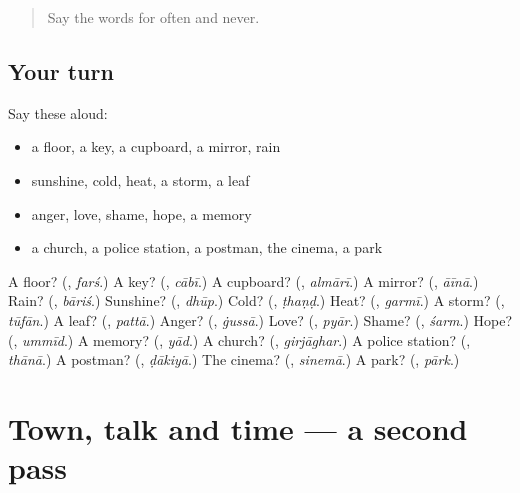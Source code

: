 \label{lesson:HI-R192-first-pass-the-house-weather-and-feelings}



\begin{quote}
Say the words for often and never.
\end{quote}

\subsection*{Your turn}
Say these aloud:

\begin{itemize}
\raggedright
  \item a floor, a key, a cupboard, a mirror, rain
  \item sunshine, cold, heat, a storm, a leaf
  \item anger, love, shame, hope, a memory
  \item a church, a police station, a postman, the cinema, a park
\end{itemize}

\begin{tcolorbox}[breakable,colback=teal!4,colframe=teal!35!black,title={Before you move on}]
A floor? (\textbf{}, \emph{farś}.) A key? (\textbf{}, \emph{cābī}.) A cupboard? (\textbf{}, \emph{almārī}.) A mirror? (\textbf{}, \emph{āīnā}.) Rain? (\textbf{}, \emph{bāriś}.) Sunshine? (\textbf{}, \emph{dhūp}.) Cold? (\textbf{}, \emph{ṭhaṇḍ}.) Heat? (\textbf{}, \emph{garmī}.) A storm? (\textbf{}, \emph{tūfān}.) A leaf? (\textbf{}, \emph{pattā}.) Anger? (\textbf{}, \emph{ġussā}.) Love? (\textbf{}, \emph{pyār}.) Shame? (\textbf{}, \emph{śarm}.) Hope? (\textbf{}, \emph{ummīd}.) A memory? (\textbf{}, \emph{yād}.) A church? (\textbf{}, \emph{girjāghar}.) A police station? (\textbf{}, \emph{thānā}.) A postman? (\textbf{}, \emph{ḍākiyā}.) The cinema? (\textbf{}, \emph{sinemā}.) A park? (\textbf{}, \emph{pārk}.)
\end{tcolorbox}
\section[(dialogue)]{Town, talk and time — a second pass}

\label{lesson:HI-R192-second-pass-town-talk-and-time}



